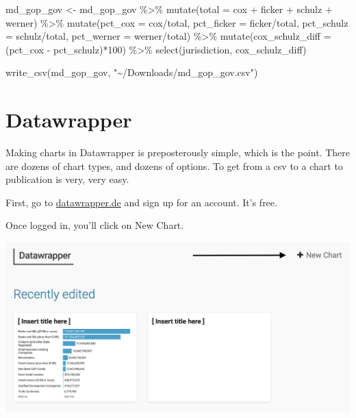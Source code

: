 \documentclass[
  letterpaper,
  DIV=11,
  numbers=noendperiod]{scrreprt}
\newenvironment{Shaded}{\begin{snugshade}}{\end{snugshade}}
\newcommand{\AttributeTok}[1]{\textcolor[rgb]{0.40,0.45,0.13}{#1}}
\newcommand{\DecValTok}[1]{\textcolor[rgb]{0.68,0.00,0.00}{#1}}
\newcommand{\FunctionTok}[1]{\textcolor[rgb]{0.28,0.35,0.67}{#1}}
\newcommand{\NormalTok}[1]{\textcolor[rgb]{0.00,0.23,0.31}{#1}}
\newcommand{\OtherTok}[1]{\textcolor[rgb]{0.00,0.23,0.31}{#1}}
\newcommand{\SpecialCharTok}[1]{\textcolor[rgb]{0.37,0.37,0.37}{#1}}
\newcommand{\StringTok}[1]{\textcolor[rgb]{0.13,0.47,0.30}{#1}}
\begin{document}
\begin{Shaded}
\begin{Highlighting}[]
\NormalTok{md\_gop\_gov }\OtherTok{\textless{}{-}}\NormalTok{ md\_gop\_gov }\SpecialCharTok{\%\textgreater{}\%}
  \FunctionTok{mutate}\NormalTok{(}\AttributeTok{total =}\NormalTok{ cox }\SpecialCharTok{+}\NormalTok{ ficker }\SpecialCharTok{+}\NormalTok{ schulz }\SpecialCharTok{+}\NormalTok{ werner) }\SpecialCharTok{\%\textgreater{}\%}
  \FunctionTok{mutate}\NormalTok{(}\AttributeTok{pct\_cox =}\NormalTok{ cox}\SpecialCharTok{/}\NormalTok{total, }\AttributeTok{pct\_ficker =}\NormalTok{ ficker}\SpecialCharTok{/}\NormalTok{total, }\AttributeTok{pct\_schulz =}\NormalTok{ schulz}\SpecialCharTok{/}\NormalTok{total, }\AttributeTok{pct\_werner =}\NormalTok{ werner}\SpecialCharTok{/}\NormalTok{total) }\SpecialCharTok{\%\textgreater{}\%}
  \FunctionTok{mutate}\NormalTok{(}\AttributeTok{cox\_schulz\_diff =}\NormalTok{ (pct\_cox }\SpecialCharTok{{-}}\NormalTok{ pct\_schulz)}\SpecialCharTok{*}\DecValTok{100}\NormalTok{) }\SpecialCharTok{\%\textgreater{}\%}
  \FunctionTok{select}\NormalTok{(jurisdiction, cox\_schulz\_diff)}

\FunctionTok{write\_csv}\NormalTok{(md\_gop\_gov, }\StringTok{"\textasciitilde{}/Downloads/md\_gop\_gov.csv"}\NormalTok{)}
\end{Highlighting}
\end{Shaded}

\hypertarget{datawrapper}{%
\section{Datawrapper}\label{datawrapper}}

Making charts in Datawrapper is preposterously simple, which is the
point. There are dozens of chart types, and dozens of options. To get
from a csv to a chart to publication is very, very easy.

First, go to \href{https://www.datawrapper.de/}{datawrapper.de} and sign
up for an account. It's free.

Once logged in, you'll click on New Chart.

\includegraphics{./images/ppp_datawrapper1.png}
\end{document}

